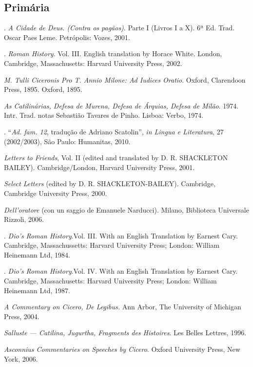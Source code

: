 \begin{bibliohedra}

\section{Primária}

. \emph{A Cidade de Deus. (Contra os pagãos)}. Parte I (Livros I a X). 6ª Ed. Trad. Oscar Paes Leme. Petrópolis: Vozes, 2001.

. \emph{Roman History}. Vol. III. English translation by Horace White. London, Cambridge, Massachusetts: Harvard University Press, 2002.

 \emph{M. Tulli Ciceronis Pro T. Annio Milone: Ad Iudices Oratio}. Oxford, Clarendoon Press, 1895. Oxford, 1895.


 \emph{As Catilinárias, Defesa de Murena, Defesa de Árquias, Defesa de Milão}. 1974. Intr. Trad. notas Sebastião Tavares de Pinho. Lisboa: Verbo, 1974.

. ``\emph{Ad. fam. 12}, tradução de Adriano Scatolin'', \emph{in Lingua e Literatura}, 27 (2002/2003), São Paulo: Humanitas, 2010.

 \emph{Letters to Friends}, Vol. II (edited and translated by D. R. SHACKLETON BAILEY). Cambridge/London, Harvard University Press, 2001.

 \emph{Select Letters} (edited by D. R. SHACKLETON-BAILEY). Cambridge, Cambridge University Press, 2000.

 \emph{Dell’oratore} (con un saggio de Emanuele Narducci). Milano, Biblioteca Universale Rizzoli, 2006.

.  \emph{Dio’s Roman History}.Vol. III. With an English Translation by Earnest Cary.  Cambridge, Massachussetts: Harvard University Press; London: William Heinemann Ltd, 1984. 

.   \emph{Dio’s Roman History}.Vol. IV. With an English Translation by Earnest Cary.  Cambridge, Massachusetts: Harvard University Press; London: William Heinemann Ltd, 1987. 

 \emph{A Commentary on Cicero, \emph{De Legibus}.} Ann Arbor, The University of Michigan Press, 2004.


 \emph{Salluste --- Catilina, Jugurtha, Fragments des Histoires}. Les Belles Lettres, 1996.

 \emph{Asconnius Commentaries on Speeches by Cicero}. Oxford University Press, New York, 2006.



\end{bibliohedra}
